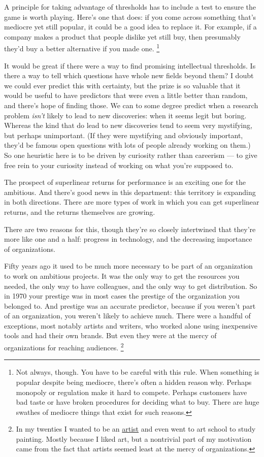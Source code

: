 A principle for taking advantage of thresholds has to include a test to
ensure the game is worth playing. Here's one that does: if you come
across something that's mediocre yet still popular, it could be a good
idea to replace it. For example, if a company makes a product that
people dislike yet still buy, then presumably they'd buy a better
alternative if you made one. \footnote{Not always, though. You have to be careful with this rule. When
something is popular despite being mediocre, there's often a hidden
reason why. Perhaps monopoly or regulation make it hard to compete.
Perhaps customers have bad taste or have broken procedures for deciding
what to buy. There are huge swathes of mediocre things that exist for
such reasons.}

It would be great if there were a way to find promising intellectual
thresholds. Is there a way to tell which questions have whole new fields
beyond them? I doubt we could ever predict this with certainty, but the
prize is so valuable that it would be useful to have predictors that
were even a little better than random, and there's hope of finding
those. We can to some degree predict when a research problem
\emph{isn't} likely to lead to new discoveries: when it seems legit but
boring. Whereas the kind that do lead to new discoveries tend to seem
very mystifying, but perhaps unimportant. (If they were mystifying and
obviously important, they'd be famous open questions with lots of people
already working on them.) So one heuristic here is to be driven by
curiosity rather than careerism --- to give free rein to your curiosity
instead of working on what you're supposed to.

The prospect of superlinear returns for performance is an exciting one
for the ambitious. And there's good news in this department: this
territory is expanding in both directions. There are more types of work
in which you can get superlinear returns, and the returns themselves are
growing.

There are two reasons for this, though they're so closely intertwined
that they're more like one and a half: progress in technology, and the
decreasing importance of organizations.

Fifty years ago it used to be much more necessary to be part of an
organization to work on ambitious projects. It was the only way to get
the resources you needed, the only way to have colleagues, and the only
way to get distribution. So in 1970 your prestige was in most cases the
prestige of the organization you belonged to. And prestige was an
accurate predictor, because if you weren't part of an organization, you
weren't likely to achieve much. There were a handful of exceptions, most
notably artists and writers, who worked alone using inexpensive tools
and had their own brands. But even they were at the mercy of
organizations for reaching audiences. \footnote{In my twenties I wanted to be an \href{worked.html}{artist} and
even went to art school to study painting. Mostly because I liked art,
but a nontrivial part of my motivation came from the fact that artists
seemed least at the mercy of organizations.}

